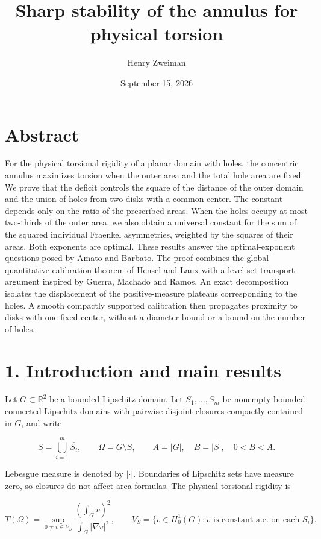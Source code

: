 \documentclass[11pt]{article}
\title{Sharp stability of the annulus for physical torsion}
\author{Henry Zweiman}
\date{September 15, 2026}
\begin{document}
\maketitle
{}\section{Abstract}\label{abstract}

For the physical torsional rigidity of a planar domain with holes, the
concentric annulus maximizes torsion when the outer area and the total
hole area are fixed. We prove that the deficit controls the square of
the distance of the outer domain and the union of holes from two disks
with a common center. The constant depends only on the ratio of the
prescribed areas. When the holes occupy at most two-thirds of the outer
area, we also obtain a universal constant for the sum of the squared
individual Fraenkel asymmetries, weighted by the squares of their areas.
Both exponents are optimal. These results answer the optimal-exponent
questions posed by Amato and Barbato. The proof combines the global
quantitative calibration theorem of Hensel and Laux with a level-set
transport argument inspired by Guerra, Machado and Ramos. An exact
decomposition isolates the displacement of the positive-measure plateaus
corresponding to the holes. A smooth compactly supported calibration
then propagates proximity to disks with one fixed center, without a
diameter bound or a bound on the number of holes.

\section{1. Introduction and main
results}\label{introduction-and-main-results}

Let \(G\subset\mathbb R^2\) be a bounded Lipschitz domain. Let
\(S_1,\ldots,S_m\) be nonempty bounded connected Lipschitz domains with
pairwise disjoint closures compactly contained in \(G\), and write

\[
S=\bigcup_{i=1}^m\overline{S_i},\qquad \Omega=G\setminus S,
\qquad A=|G|,\quad B=|S|,\quad 0<B<A.
\tag{1}
\]

Lebesgue measure is denoted by \(|\cdot|\). Boundaries of Lipschitz sets
have measure zero, so closures do not affect area formulas. The physical
torsional rigidity is

\[
T(\Omega)=\sup_{0\ne v\in V_S}
\frac{\left(\int_Gv\right)^2}{\int_G|\nabla v|^2},\qquad
V_S=\{v\in H_0^1(G):v\text{ is constant a.e. on each }S_i\}.
\tag{2}
\]
\end{document}
